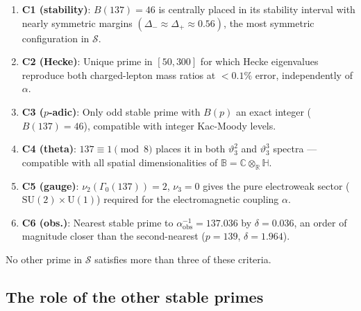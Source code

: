 \documentclass[12pt,a4paper]{article}
\theoremstyle{definition}
\theoremstyle{remark}
\newcommand{\BB}{\mathbb{B}}
\newcommand{\CC}{\mathbb{C}}
\newcommand{\RR}{\mathbb{R}}
\newcommand{\HH}{\mathbb{H}}
\begin{document}
\begin{enumerate}
  \item \textbf{C1 (stability)}: $B(137) = 46$ is centrally placed in its
        stability interval with nearly symmetric margins $(\Delta_- \approx
        \Delta_+ \approx 0.56)$, the most symmetric configuration in $\mathcal{S}$.
  \item \textbf{C2 (Hecke)}: Unique prime in $[50, 300]$ for which Hecke
        eigenvalues reproduce both charged-lepton mass ratios at $< 0.1\%$
        error, independently of $\alpha$.
  \item \textbf{C3 ($p$-adic)}: Only odd stable prime with $B(p)$ an
        exact integer ($B(137) = 46$), compatible with integer Kac-Moody
        levels.
  \item \textbf{C4 (theta)}: $137 \equiv 1 \pmod{8}$ places it in both
        $\vartheta_3^2$ and $\vartheta_3^3$ spectra — compatible with all
        spatial dimensionalities of $\BB = \CC \otimes_\RR \HH$.
  \item \textbf{C5 (gauge)}: $\nu_2(\Gamma_0(137)) = 2$, $\nu_3 = 0$ gives
        the pure electroweak sector ($\mathrm{SU}(2) \times \mathrm{U}(1)$)
        required for the electromagnetic coupling $\alpha$.
  \item \textbf{C6 (obs.)}: Nearest stable prime to $\alpha^{-1}_{\mathrm{obs}}
        = 137.036$ by $\delta = 0.036$, an order of magnitude closer than the
        second-nearest ($p = 139$, $\delta = 1.964$).
\end{enumerate}

No other prime in $\mathcal{S}$ satisfies more than three of these criteria.

\subsection{The role of the other stable primes}
\end{document}
